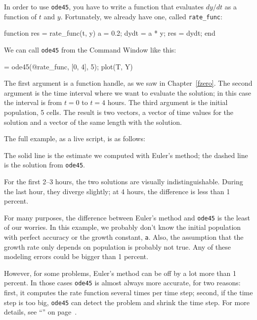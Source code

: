 
In order to use \lstinline{ode45}, you have to write a function that evaluates $dy/dt$ as a function of $t$ and $y$.  Fortunately, we already have one, called \lstinline{rate_func}:

\begin{code}
function res = rate_func(t, y)
   a = 0.2;
   dydt = a * y;
   res = dydt;
end
\end{code}

We can call \lstinline{ode45} from the Command Window like this:

\begin{code}
[T, Y] = ode45(@rate_func, [0, 4], 5);
plot(T, Y)
\end{code}

The first argument is a function handle, as we saw in Chapter~\ref{fzero}.  The second argument is the time interval where we want to evaluate the solution; in this case the interval is from $t=0$ to $t=4$ hours.  The third argument is the initial population, 5 cells.  The result is two vectors, a vector of time values for the solution and a vector of the same length with the solution.


The full example, as a live script, is as follows:


The solid line is the estimate we computed with Euler's method; the dashed line is the solution from \lstinline{ode45}.

For the first 2--3 hours, the two solutions are visually indistinguishable.  During the last hour, they diverge slightly; at 4 hours, the difference is less than 1 percent.

For many purposes, the difference between Euler's method and \lstinline{ode45} is the least of our worries.  In this example, we probably don't know the initial population with perfect accuracy or the growth constant, \lstinline{a}.  Also, the assumption that the growth rate only depends on population is probably not true.  Any of these modeling errors could be bigger than 1 percent.

However, for some problems, Euler's method can be off by a lot more than 1 percent.
In those cases \lstinline{ode45} is almost always more accurate, for two reasons: first, it computes the rate function several times per time step; second, if the time step is too big, \lstinline{ode45} can detect the problem and shrink the time step.  For more details, see ``'' on page~\pageref{s:howode45}.


